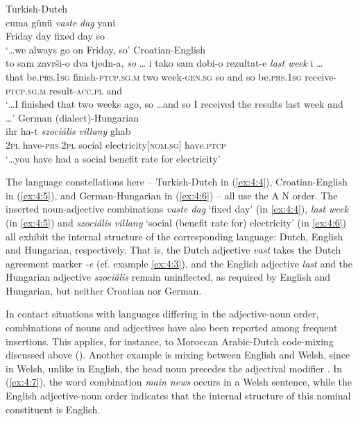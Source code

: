 \ea{\label{ex:4:4}}
Turkish-Dutch \citep[177]{backus-two-1996}\\
\gll {\dots} cuma günü \textit{vaste} \textit{dag} yani\\
    {} Friday day fixed day so\\
\glt `\dots we always go on Friday, so' 
\ex{\label{ex:4:5}}
Croatian-English \citep[231]{hlavac-second-generation-2003}\\
\gll {\dots} to sam završi-o dva tjedn-a, \textit{so} {\dots} i tako sam dobi-o rezultat-e \textit{last} \textit{week} i {\dots}\\
	{} that be.\textsc{prs.1sg} finish-\textsc{ptcp.sg.m} two week-\textsc{gen.sg} so {} and so be.\textsc{prs.1sg} receive-\textsc{ptcp.sg.m}  result-\textsc{acc.pl} {} {} and {}\\
\glt `\dots I finished that two weeks ago, so \dots and so I received the results last week and \dots'
\ex{\label{ex:4:6}}
German (dialect)-Hungarian \citep[373]{szabo-language-2010}\\
\gll {\dots} ihr ha-t \textit{szociális} \textit{villany} ghab\\
	{} \textsc{2pl} have-\textsc{prs.2pl} social electricity[\textsc{nom.sg}] have.\textsc{ptcp}\\
\glt `\dots you have had a social benefit rate for electricity'
\z

\noindent The language constellations here -- Turkish-Dutch in (\ref{ex:4:4}), Croatian-English in (\ref{ex:4:5}), and German-Hungarian in (\ref{ex:4:6}) -- all use the A N order. The inserted noun-adjective combinations \textit{vaste dag} `fixed day' (in \ref{ex:4:4}), \textit{last week} (in \ref{ex:4:5}) and \textit{szociális villany} `social (benefit rate for) electricity' (in \ref{ex:4:6}) all exhibit the internal structure of the corresponding language: Dutch, English and Hungarian, respectively. That is, the Dutch adjective \textit{vast} takes the Dutch agreement marker \textit{-e} (cf. example \ref{ex:4:3}), and the English adjective \textit{last} and the Hungarian adjective \textit{szociális} remain uninflected, as required by English and Hungarian, but neither Croatian nor German.

In contact situations with languages differing in the adjective-noun order, combinations of nouns and adjectives have also been reported among frequent insertions. This applies, for instance, to Moroccan Arabic-Dutch code-mixing discussed above (). Another example is mixing between English and Welsh, since in Welsh, unlike in English, the head noun precedes the adjectival modifier \citep[cf.][260]{deuchar-congruence-2005}. In (\ref{ex:4:7}), the word combination \textit{main news} occurs in a Welsh sentence, while the English adjective-noun order indicates that the internal structure of this nominal constituent is English.

